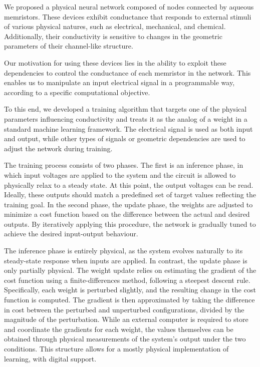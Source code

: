 \documentclass[reprint,superscriptaddress,prb,showkeys]{revtex4-2}
\begin{document}
We proposed a physical neural network composed of nodes connected by aqueous memristors. These devices exhibit conductance that responds to external stimuli of various physical natures, such as electrical, mechanical, and chemical. Additionally, their conductivity is sensitive to changes in the geometric parameters of their channel-like structure.

Our motivation for using these devices lies in the ability to exploit these dependencies to control the conductance of each memristor in the network. This enables us to manipulate an input electrical signal in a programmable way, according to a specific computational objective.

To this end, we developed a training algorithm that targets one of the physical parameters influencing conductivity and treats it as the analog of a weight in a standard machine learning framework. The electrical signal is used as both input and output, while other types of signals or geometric dependencies are used to adjust the network during training.

The training process consists of two phases. The first is an inference phase, in which input voltages are applied to the system and the circuit is allowed to physically relax to a steady state. At this point, the output voltages can be read. Ideally, these outputs should match a predefined set of target values reflecting the training goal. In the second phase, the update phase, the weights are adjusted to minimize a cost function based on the difference between the actual and desired outputs. By iteratively applying this procedure, the network is gradually tuned to achieve the desired input-output behaviour.

The inference phase is entirely physical, as the system evolves naturally to its steady-state response when inputs are applied. In contrast, the update phase is only partially physical. The weight update relies on estimating the gradient of the cost function using a finite-differences method, following a steepest descent rule. Specifically, each weight is perturbed slightly, and the resulting change in the cost function is computed. The gradient is then approximated by taking the difference in cost between the perturbed and unperturbed configurations, divided by the magnitude of the perturbation. While an external computer is required to store and coordinate the gradients for each weight, the values themselves can be obtained through physical measurements of the system's output under the two conditions. This structure allows for a mostly physical implementation of learning, with digital support.
\end{document}

